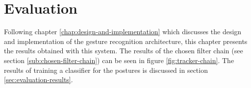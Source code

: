 \chapter{Evaluation}
\label{chap:evaluation}

Following chapter \ref{chap:design-and-implementation} which discusses the design and implementation of the gesture recognition architecture, this chapter presents the results obtained with this system. The results of the chosen filter chain (see section \ref{sub:chosen-filter-chain}) can be seen in figure \ref{fig:tracker-chain}. The results of training a classifier for the postures is discussed in section \ref{sec:evaluation-results}. 
\begin{figure}[H]
	\centering
	\hspace{0.005\textwidth}
	\hspace{0.005\textwidth}
	\hspace{0.005\textwidth}
	\hspace{0.005\textwidth}

\end{figure}
